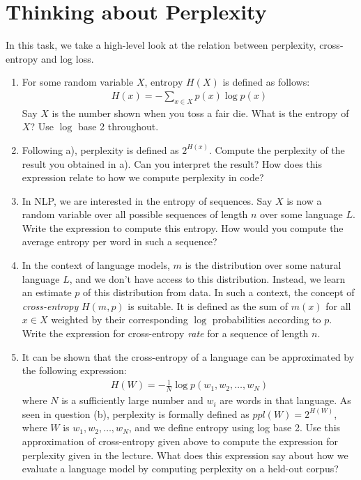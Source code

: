 \documentclass[11pt,a4paper]{article}
\begin{document}
\section{Thinking about Perplexity}

In this task, we take a high-level look at the relation between perplexity,
cross-entropy and log loss.

\begin{enumerate}[label=(\alph*)]
    \item For some random variable $X$, entropy $H(X)$ is defined as follows:
          \begin{align}\label{eq:def_entropy}
              H(x) = -\sum_{x\in X} p(x)\log p(x)
          \end{align}
          Say $X$ is the number shown when you toss a fair die.
          What is the entropy of $X$?
          Use $\log$ base 2 throughout.
    \item Following a), perplexity is defined as $2^{H(x)}$. Compute the
          perplexity of the result you obtained in a).
          Can you interpret the result?
          How does this expression relate to how we compute perplexity in code?
    \item In NLP, we are interested in the entropy of sequences.
          Say $X$ is now a random variable over all possible sequences of length
          $n$ over some language $L$.
          Write the expression to compute this entropy.
          How would you compute the average entropy per word in such a sequence?
    \item In the context of language models, $m$ is the distribution over some
          natural language $L$, and we don't have access to this distribution.
          Instead, we learn an estimate $p$ of this distribution from data.
          In such a context, the concept of \emph{cross-entropy} $H(m,p)$ is
          suitable.
          It is defined as the sum of $m(x)$ for all $x\in X$ weighted by their
          corresponding $\log$ probabilities according to $p$.
          Write the expression for cross-entropy \emph{rate} for a sequence of 
          length $n$.
    \item It can be shown that the cross-entropy of a language can be
          approximated by the following expression:
          \begin{align}\label{eq:language_entropy}
              H(W) = -\frac{1}{N} \log p(w_1,w_2,\ldots,w_N)
          \end{align}
          where $N$ is a sufficiently large number and $w_i$ are words in that
          language.
          As seen in question (b), perplexity is formally defined as
          $ppl(W) = 2^{H(W)}$, where $W$ is $w_1, w_2, \ldots, w_N$, and we
          define entropy using log base 2.
          Use this approximation of cross-entropy given above to compute the
          expression for perplexity given in the lecture.
          What does this expression say about how we evaluate a language
          model by computing perplexity on a held-out corpus?
\end{enumerate}
\end{document}
